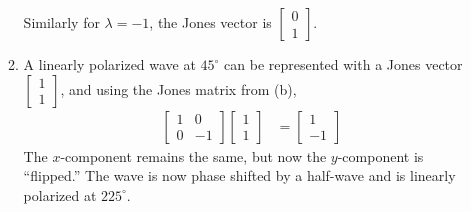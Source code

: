 \documentclass{homework}
\begin{document}
\begin{enumerate}
\begin{enumerate}
				Similarly for $\lambda = -1$, the Jones vector is 
				$\left[
					\begin{matrix}
						0 \\
						1
					\end{matrix}
				\right]$.
			\item A linearly polarized wave at $45^\circ$ can be represented with a Jones vector $\left[\begin{matrix}
			1 \\ 1
			\end{matrix}\right]$, and using the Jones matrix from (b), \begin{align*}
				\left[\begin{matrix}
					1 & 0 \\
					0 & -1
				\end{matrix}\right] \left[
				\begin{matrix}
					1 \\ 1
				\end{matrix}
			\right] & = \left[
				\begin{matrix}
					1 \\
					-1
				\end{matrix}
			\right]
			\end{align*}
		The $x$-component remains the same, but now the $y$-component is ``flipped.'' The wave is now phase shifted by a half-wave and is linearly polarized at $225^\circ$.
		\end{enumerate}
	\end{enumerate}
\end{document}
